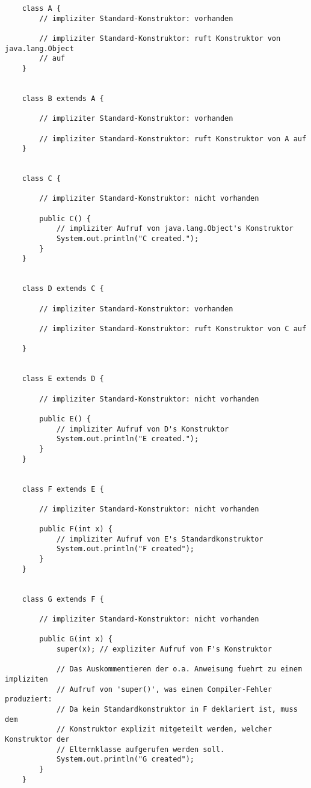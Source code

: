 \begin{verbatim}
    class A {
        // impliziter Standard-Konstruktor: vorhanden

        // impliziter Standard-Konstruktor: ruft Konstruktor von java.lang.Object
        // auf
    }


    class B extends A {

        // impliziter Standard-Konstruktor: vorhanden

        // impliziter Standard-Konstruktor: ruft Konstruktor von A auf
    }


    class C {

        // impliziter Standard-Konstruktor: nicht vorhanden

        public C() {
            // impliziter Aufruf von java.lang.Object's Konstruktor
            System.out.println("C created.");
        }
    }


    class D extends C {

        // impliziter Standard-Konstruktor: vorhanden

        // impliziter Standard-Konstruktor: ruft Konstruktor von C auf

    }


    class E extends D {

        // impliziter Standard-Konstruktor: nicht vorhanden

        public E() {
            // impliziter Aufruf von D's Konstruktor
            System.out.println("E created.");
        }
    }


    class F extends E {

        // impliziter Standard-Konstruktor: nicht vorhanden

        public F(int x) {
            // impliziter Aufruf von E's Standardkonstruktor
            System.out.println("F created");
        }
    }


    class G extends F {

        // impliziter Standard-Konstruktor: nicht vorhanden

        public G(int x) {
            super(x); // expliziter Aufruf von F's Konstruktor

            // Das Auskommentieren der o.a. Anweisung fuehrt zu einem impliziten
            // Aufruf von 'super()', was einen Compiler-Fehler produziert:
            // Da kein Standardkonstruktor in F deklariert ist, muss dem
            // Konstruktor explizit mitgeteilt werden, welcher Konstruktor der
            // Elternklasse aufgerufen werden soll.
            System.out.println("G created");
        }
    }
\end{verbatim}